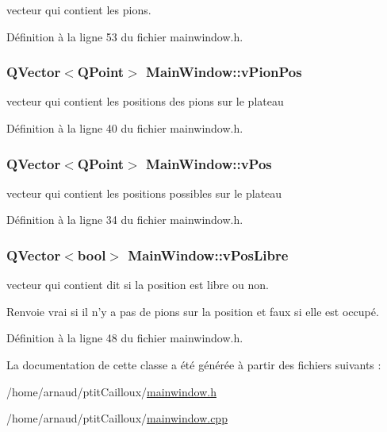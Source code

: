 vecteur qui contient les pions. 



Définition à la ligne 53 du fichier mainwindow.\-h.

\hypertarget{class_main_window_a8d561e817c4df106f2b54fe14d3e86f3}{
\subsubsection[{v\-Pion\-Pos}]{\setlength{\rightskip}{0pt plus 5cm}Q\-Vector$<$Q\-Point$>$ Main\-Window\-::v\-Pion\-Pos}}\label{class_main_window_a8d561e817c4df106f2b54fe14d3e86f3}


vecteur qui contient les positions des pions sur le plateau 



Définition à la ligne 40 du fichier mainwindow.\-h.

\hypertarget{class_main_window_a83813767ed28ca71358707f562095cf1}{
\subsubsection[{v\-Pos}]{\setlength{\rightskip}{0pt plus 5cm}Q\-Vector$<$Q\-Point$>$ Main\-Window\-::v\-Pos}}\label{class_main_window_a83813767ed28ca71358707f562095cf1}


vecteur qui contient les positions possibles sur le plateau 



Définition à la ligne 34 du fichier mainwindow.\-h.

\hypertarget{class_main_window_ad7397a5dbe03868a4b2502e0a993fcf4}{
\subsubsection[{v\-Pos\-Libre}]{\setlength{\rightskip}{0pt plus 5cm}Q\-Vector$<$bool$>$ Main\-Window\-::v\-Pos\-Libre}}\label{class_main_window_ad7397a5dbe03868a4b2502e0a993fcf4}


vecteur qui contient dit si la position est libre ou non. 

\begin{DoxyReturn}{Renvoie}
vrai si il n'y a pas de pions sur la position et faux si elle est occupé. 
\end{DoxyReturn}


Définition à la ligne 48 du fichier mainwindow.\-h.



La documentation de cette classe a été générée à partir des fichiers suivants \-:\begin{DoxyCompactItemize}
\item 
/home/arnaud/ptit\-Cailloux/\hyperlink{mainwindow_8h}{mainwindow.\-h}\item 
/home/arnaud/ptit\-Cailloux/\hyperlink{mainwindow_8cpp}{mainwindow.\-cpp}\end{DoxyCompactItemize}
